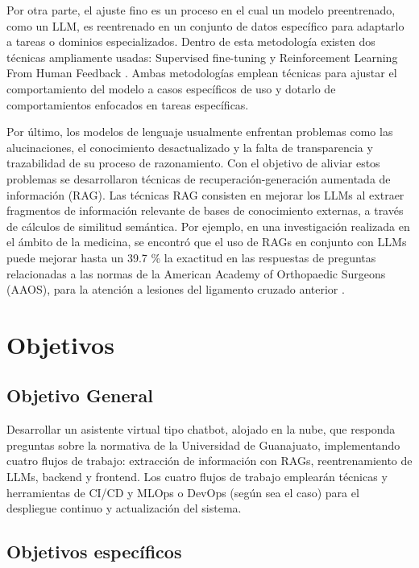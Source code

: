 Por otra parte, el ajuste fino es un proceso en el cual un modelo preentrenado,
como un LLM, es reentrenado en un conjunto de datos específico para adaptarlo a
tareas o dominios especializados. Dentro de esta metodología existen dos técnicas
ampliamente usadas: Supervised fine-tuning y Reinforcement Learning From Human
Feedback \cite{anisuzzaman_fine-tuning_2025}. Ambas metodologías emplean técnicas
para ajustar el comportamiento del modelo a casos específicos de uso y dotarlo de
comportamientos enfocados en tareas específicas.

Por último, los modelos de lenguaje usualmente enfrentan problemas como las
alucinaciones, el conocimiento desactualizado y la falta de transparencia y
trazabilidad de su proceso de razonamiento. Con el objetivo de aliviar estos
problemas se desarrollaron técnicas de recuperación-generación aumentada de
información (RAG). Las técnicas RAG consisten en mejorar los LLMs al extraer
fragmentos de información relevante de bases de conocimiento externas, a través
de cálculos de similitud semántica. Por ejemplo, en una investigación realizada
en el ámbito de la medicina, se encontró que el uso de RAGs en conjunto con LLMs
puede mejorar hasta un 39.7 \% la exactitud en las respuestas de preguntas
relacionadas a las normas de la American Academy of Orthopaedic Surgeons (AAOS),
para la atención a lesiones del ligamento cruzado anterior \cite{woo_custom_2025}.

\section{Objetivos}

\subsection{Objetivo General}

Desarrollar un asistente virtual tipo chatbot, alojado en la nube, que responda
preguntas sobre la normativa de la Universidad de Guanajuato, implementando cuatro
flujos de trabajo: extracción de información con RAGs, reentrenamiento de LLMs,
backend y frontend. Los cuatro flujos de trabajo emplearán técnicas y herramientas
de CI/CD y MLOps o DevOps (según sea el caso) para el despliegue continuo y
actualización del sistema.

\subsection{Objetivos específicos}

